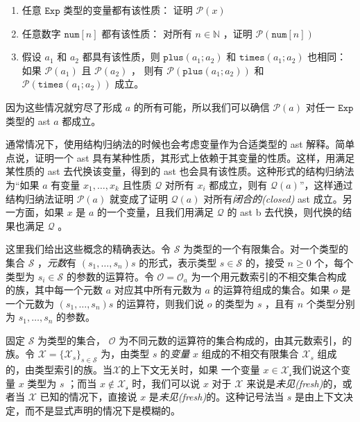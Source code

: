 \begin{enumerate}
\def\labelenumi{\arabic{enumi}.}
\item
  任意 \(\texttt{Exp}\) 类型的变量都有该性质： 证明 \(\mathcal{P}(x)\)
\item
  任意数字 \(\texttt{num}[n]\) 都有该性质： 对所有 \(n \in \mathbb{N}\)
  ，证明 \(\mathcal{P}(\texttt{num}[n])\)
\item
  假设 \(a_1\) 和 \(a_2\) 都具有该性质，则 \(\texttt{plus}(a_1;a_2)\) 和
  \(\texttt{times}(a_1;a_2)\) 也相同：如果 \(\mathcal{P}(a_1)\) 且
  \(\mathcal{P}(a_2)\) ， 则有 \(\mathcal{P}(\texttt{plus}(a_1;a_2))\)
  和 \(\mathcal{P}(\texttt{times}(a_1;a_2))\) 成立。
\end{enumerate}

因为这些情况就穷尽了形成 \(a\) 的所有可能，所以我们可以确信
\(\mathcal{P}(a)\) 对任一 \(\texttt{Exp}\) 类型的 ast \(a\) 都成立。

通常情况下，使用结构归纳法的时候也会考虑变量作为合适类型的 ast
解释。简单点说，证明一个 ast
具有某种性质，其形式上依赖于其变量的性质。这样，用满足某性质的 ast
去代换该变量，得到的 ast 也会具有该性质。这种形式的结构归纳法为``如果
\(a\) 有变量 \(x_1,\ldots,x_k\) 且性质 \(\mathcal{Q}\) 对所有 \(x_i\)
都成立，则有 \(\mathcal{Q}(a)\)''，这样通过结构归纳法证明
\(\mathcal{P}(a)\) 就变成了证明 \(\mathcal{Q}(a)\)
对所有\emph{闭合的(closed)} ast 成立。另一方面，如果 \(x\) 是 \(a\)
的一个变量，且我们用满足 \(\mathcal{Q}\) 的 ast b
去代换，则代换的结果也满足 \(\mathcal{Q}\) 。

这里我们给出这些概念的精确表达。令 \(\mathcal{S}\)
为类型的一个有限集合。对一个类型的集合 \(\mathcal{S}\) ，\emph{元数}有
\((s_1,\ldots ,s_n)s\) 的形式，表示类型 \(s\in \mathcal{S}\) 的，接受
\(n\ge 0\) 个，每个类型为 \(s_i \in \mathcal{S}\) 的参数的运算符。令
\(\mathcal{O} = {\mathcal {O}_a}\)
为一个用元数索引的不相交集合构成的族，其中每一个元数 \(a\)
对应其中所有元数为 \(a\) 的运算符组成的集合。如果 \(o\) 是一个元数为
\((s_1,\ldots,s_n)s\) 的运算符，则我们说 \(o\) 的类型为 \(s\) ，且有
\(n\) 个类型分别为 \(s_1,\ldots,s_n\) 的参数。

固定 \(\mathcal{S}\) 为类型的集合， \(\mathcal{O}\)
为不同元数的运算符的集合构成的，由其元数索引，的族。令
\(\mathcal{X} = \{\mathcal{X}_s\}_{s \in \mathcal{S}}\) 为，由类型 \(s\)
的\emph{变量} \(x\) 组成的不相交有限集合 \(\mathcal{X}_s\)
组成的，由类型索引的族。当\(\mathcal{X}\)的上下文无关时，如果 一个变量
\(x\in \mathcal{X_s}\)我们说这个变量 \(x\) 类型为 \(s\) ；而当
\(x \notin \mathcal{X_s}\) 时，我们可以说 \(x\) 对于 \(\mathcal{X}\)
来说是\emph{未见(fresh)}的，或者当 \(\mathcal{X}\) 已知的情况下，直接说
\(x\) 是\emph{未见(fresh)}的。这种记号法当 \(s\)
是由上下文决定，而不是显式声明的情况下是模糊的。

